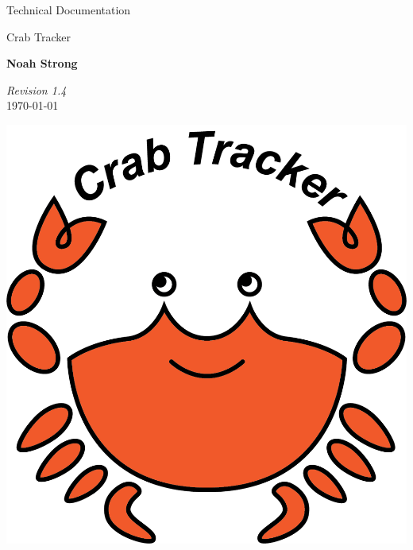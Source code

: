 \documentclass[12pt]{article}
\begin{document}
\begin{titlepage}

\vspace*{5cm}

\begin{huge}
Technical Documentation
\end{huge}

\begin{large}
Crab Tracker

\vspace*{1cm}

\textbf{Noah Strong}

\vspace*{1cm}
\end{large}

\textit{Revision 1.4}\\
\today

\vfill
\hfill \includegraphics[scale=1]{ct-logo.png}

\end{titlepage}
\tableofcontents{}

\newpage

\end{document}
